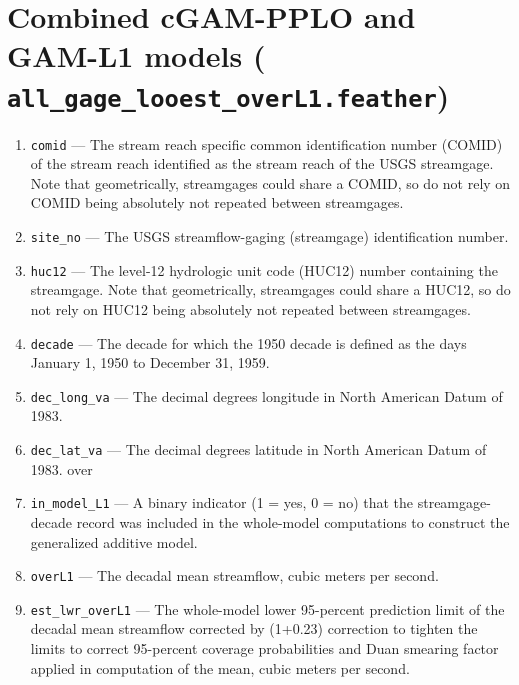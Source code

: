 \documentclass[1p, authoryear, 11pt, times, preprint]{elsarticle}
\newcommand{\code}[1]{{\color{black}%
                       \mbox{\lstinline[basicstyle={\small\ttfamily},
                                        keywordstyle=\scriptsize\ttfamily]|#1|}}}
\begin{document}




\section{Combined cGAM-PPLO and GAM-L1 models (\code{all_gage_looest_overL1.feather})}
\begin{enumerate}
\footnotesize
\RaggedRight
\item \code{comid} --- The stream reach specific common identification number (COMID) of the stream reach identified as the stream reach of the USGS streamgage. Note that geometrically, streamgages could share a COMID, so do not rely on COMID being absolutely not repeated between streamgages.
\item \code{site_no} --- The USGS streamflow-gaging (streamgage) identification number.
\item \code{huc12} --- The level-12 hydrologic unit code (HUC12) number containing the streamgage. Note that geometrically, streamgages could share a HUC12, so do not rely on HUC12 being absolutely not repeated between streamgages.
\item \code{decade} --- The decade for which the 1950 decade is defined as the days January 1, 1950 to December 31, 1959.
\item \code{dec_long_va} --- The decimal degrees longitude in North American Datum of 1983.
\item \code{dec_lat_va} --- The decimal degrees latitude in North American Datum of 1983.
over
\item \code{in_model_L1} --- A binary indicator (1 = yes, 0 = no) that the streamgage-decade record was included in the whole-model computations to construct the generalized additive model.
\item \code{overL1} --- The decadal mean streamflow, cubic meters per second.
\item \code{est_lwr_overL1} --- The whole-model lower 95-percent prediction limit of the decadal mean streamflow corrected by (1+0.23) correction to tighten the limits to correct 95-percent coverage probabilities and Duan smearing factor applied in computation of the mean, cubic meters per second.

\end{enumerate}
\end{document}

